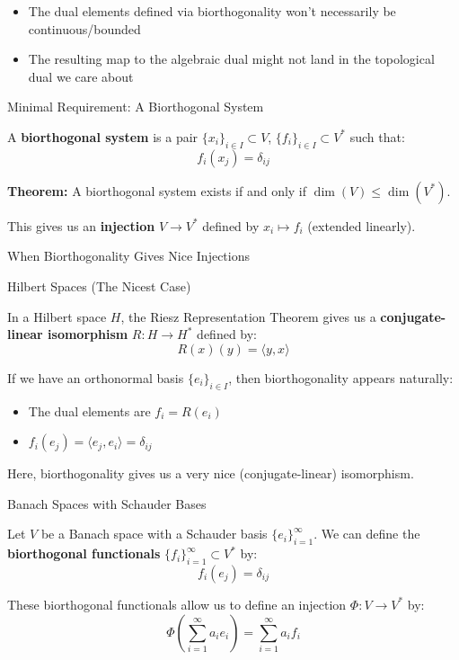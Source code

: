 \documentclass[aps,preprint]{revtex4}
\newenvironment{answer}
  {\begin{tcolorbox}[colback=green!5!white,colframe=green!75!black,title=Answer]}
  {\end{tcolorbox}}
\begin{document}
\begin{answer}
\begin{itemize}
\item The dual elements defined via biorthogonality won't necessarily be
continuous/bounded

\item The resulting map to the algebraic dual might not land in the
topological dual we care about
\end{itemize}

Minimal Requirement: A Biorthogonal System

A \textbf{biorthogonal system} is a pair $\{x_i\}_{i\in I} \subset V$, $%
\{f_i\}_{i\in I} \subset V^*$ such that: 
\begin{equation*}
f_i(x_j) = \delta_{ij}
\end{equation*}

\textbf{Theorem:} A biorthogonal system exists if and only if $\dim(V) \leq
\dim(V^*)$.

This gives us an \textbf{injection} $V \to V^*$ defined by $x_i \mapsto f_i$
(extended linearly).

When Biorthogonality Gives Nice Injections

Hilbert Spaces (The Nicest Case)

In a Hilbert space $H$, the Riesz Representation Theorem gives us a \textbf{%
conjugate-linear isomorphism} $R: H \to H^*$ defined by: 
\begin{equation*}
R(x)(y) = \langle y, x \rangle
\end{equation*}

If we have an orthonormal basis $\{e_i\}_{i\in I}$, then biorthogonality
appears naturally:

\begin{itemize}
\item The dual elements are $f_i = R(e_i)$

\item $f_i(e_j) = \langle e_j, e_i \rangle = \delta_{ij}$
\end{itemize}

Here, biorthogonality gives us a very nice (conjugate-linear) isomorphism.

Banach Spaces with Schauder Bases

Let $V$ be a Banach space with a Schauder basis $\{e_i\}_{i=1}^\infty$. We
can define the \textbf{biorthogonal functionals} $\{f_i\}_{i=1}^\infty
\subset V^*$ by: 
\begin{equation*}
f_i(e_j) = \delta_{ij}
\end{equation*}

These biorthogonal functionals allow us to define an injection $\Phi: V \to
V^*$ by: 
\begin{equation*}
\Phi\left(\sum_{i=1}^\infty a_i e_i\right) = \sum_{i=1}^\infty a_i f_i
\end{equation*}


\end{answer}
\end{document}
